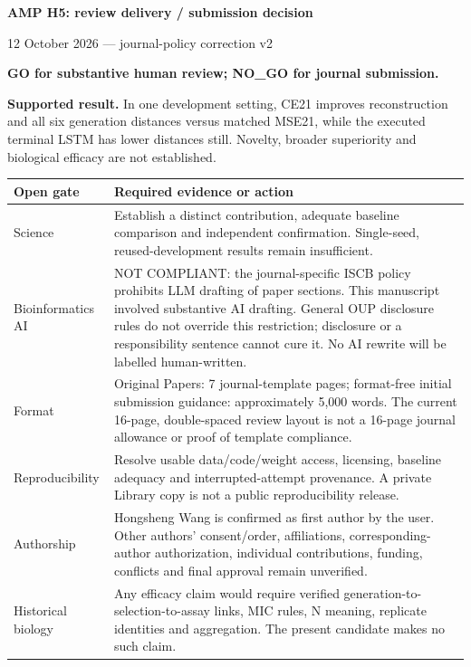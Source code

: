 \documentclass[11pt,a4paper]{article}
\begin{document}
\begin{center}\Large\textbf{AMP H5: review delivery / submission decision}\par\normalsize 12 October 2026 --- journal-policy correction v2\end{center}
\noindent\textbf{GO for substantive human review; NO\_GO for journal submission.}

\noindent\textbf{Supported result.} In one development setting, CE21 improves reconstruction and all six generation distances versus matched MSE21, while the executed terminal LSTM has lower distances still. Novelty, broader superiority and biological efficacy are not established.

\begin{tabular}{@{}p{.20\linewidth}p{.73\linewidth}@{}}\toprule
Open gate & Required evidence or action\\\midrule
Science & Establish a distinct contribution, adequate baseline comparison and independent confirmation. Single-seed, reused-development results remain insufficient.\\[5pt]
Bioinformatics AI & NOT COMPLIANT: the journal-specific ISCB policy prohibits LLM drafting of paper sections. This manuscript involved substantive AI drafting. General OUP disclosure rules do not override this restriction; disclosure or a responsibility sentence cannot cure it. No AI rewrite will be labelled human-written.\\[5pt]
Format & Original Papers: 7 journal-template pages; format-free initial submission guidance: approximately 5,000 words. The current 16-page, double-spaced review layout is not a 16-page journal allowance or proof of template compliance.\\[5pt]
Reproducibility & Resolve usable data/code/weight access, licensing, baseline adequacy and interrupted-attempt provenance. A private Library copy is not a public reproducibility release.\\[5pt]
Authorship & Hongsheng Wang is confirmed as first author by the user. Other authors' consent/order, affiliations, corresponding-author authorization, individual contributions, funding, conflicts and final approval remain unverified.\\[5pt]
Historical biology & Any efficacy claim would require verified generation-to-selection-to-assay links, MIC rules, N meaning, replicate identities and aggregation. The present candidate makes no such claim.\\\bottomrule
\end{tabular}
\end{document}
